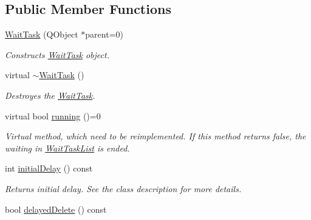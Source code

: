 \subsection*{Public Member Functions}
\begin{DoxyCompactItemize}
\item 
\hyperlink{class_wait_task_ac439dd31c2e1d6fc1df3328fa9b30a68}{Wait\+Task} (Q\+Object $\ast$parent=0)
\begin{DoxyCompactList}\small\item\em Constructs \hyperlink{class_wait_task}{Wait\+Task} object. \end{DoxyCompactList}\item 
\hypertarget{class_wait_task_ae5b9cca0e1b394f23f82d7ef5bd3a517}{}virtual \hyperlink{class_wait_task_ae5b9cca0e1b394f23f82d7ef5bd3a517}{$\sim$\+Wait\+Task} ()\label{class_wait_task_ae5b9cca0e1b394f23f82d7ef5bd3a517}

\begin{DoxyCompactList}\small\item\em Destroyes the \hyperlink{class_wait_task}{Wait\+Task}. \end{DoxyCompactList}\item 
\hypertarget{class_wait_task_a39f09592449c61469d093f980a23cbfd}{}virtual bool \hyperlink{class_wait_task_a39f09592449c61469d093f980a23cbfd}{running} ()=0\label{class_wait_task_a39f09592449c61469d093f980a23cbfd}

\begin{DoxyCompactList}\small\item\em Virtual method, which need to be reimplemented. If this method returns false, the waiting in \hyperlink{class_wait_task_list}{Wait\+Task\+List} is ended. \end{DoxyCompactList}\item 
\hypertarget{class_wait_task_a3984ae37eae1a984db2f2417df2bfbbf}{}int \hyperlink{class_wait_task_a3984ae37eae1a984db2f2417df2bfbbf}{initial\+Delay} () const \label{class_wait_task_a3984ae37eae1a984db2f2417df2bfbbf}

\begin{DoxyCompactList}\small\item\em Returns initial delay. See the class description for more details. \end{DoxyCompactList}\item 
\hypertarget{class_wait_task_a151808251a297dec52be3d6713eaaf1d}{}bool \hyperlink{class_wait_task_a151808251a297dec52be3d6713eaaf1d}{delayed\+Delete} () const \label{class_wait_task_a151808251a297dec52be3d6713eaaf1d}


\end{DoxyCompactItemize}
